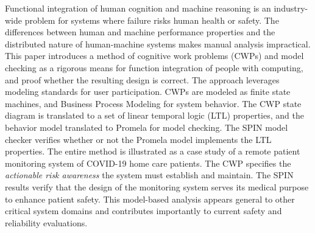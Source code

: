Functional integration of human cognition and machine reasoning is an industry-wide problem for systems where failure risks human health or safety. The differences between human and machine performance properties and the distributed nature of human-machine systems makes manual analysis impractical. This paper introduces a method of cognitive work problems (CWPs) and model checking as a rigorous means for function integration of people with computing, and proof whether the resulting design is correct. The approach leverages modeling standards for user participation. CWPs are modeled as finite state machines, and Business Process Modeling for system behavior. The CWP state diagram is translated to a set of linear temporal logic (LTL) properties, and the behavior model translated to Promela for model checking. The SPIN model checker verifies whether or not the Promela model implements the LTL properties. The entire method is illustrated as a case study of a remote patient monitoring system of COVID-19 home care patients. The CWP specifies the \emph{actionable risk awareness} the system must establish and maintain. The SPIN results verify that the design of the monitoring system serves its medical purpose to enhance patient safety. This model-based analysis appears general to other critical system domains and contributes importantly to current safety and reliability evaluations.